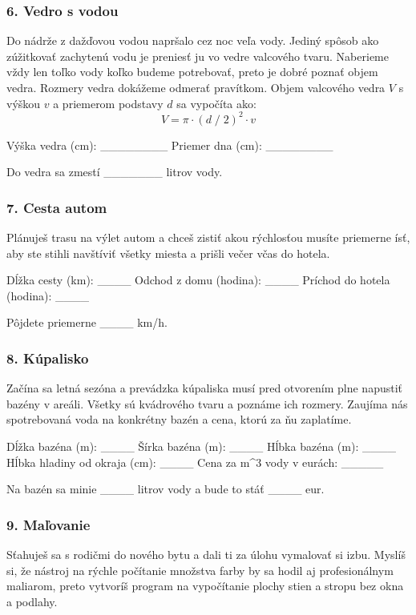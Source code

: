 \subsubsection*{6. Vedro s vodou}
Do nádrže z dažďovou vodou napršalo cez noc veľa vody. Jediný spôsob ako zúžitkovať zachytenú vodu je preniesť ju vo vedre valcového tvaru. Naberieme vždy len toľko vody koľko budeme potrebovať, preto je dobré poznať objem vedra. Rozmery vedra dokážeme odmerať pravítkom. Objem valcového vedra $V$ s výškou $v$ a priemerom podstavy $d$ sa vypočíta ako:
$$ V = \pi \cdot (d\;/\;2)^2 \cdot v $$

\begin{code}
Výška vedra (cm): ________
Priemer dna (cm): ________

Do vedra sa zmestí _______ litrov vody.
\end{code}

\subsubsection*{7. Cesta autom}
Plánuješ trasu na výlet autom a chceš zistiť akou rýchlosťou musíte priemerne ísť, aby ste stihli navštíviť všetky miesta a prišli večer včas do hotela.

\begin{code}
Dĺžka cesty (km): ____
Odchod z domu (hodina): ____
Príchod do hotela (hodina): ____

Pôjdete priemerne ____ km/h.
\end{code}

\subsubsection*{8. Kúpalisko}
Začína sa letná sezóna a prevádzka kúpaliska musí pred otvorením plne napustiť bazény v areáli. Všetky sú kvádrového tvaru a poznáme ich rozmery. Zaujíma nás spotrebovaná voda na konkrétny bazén a cena, ktorú za ňu zaplatíme.

\begin{code}
Dĺžka bazéna (m): ____
Šírka bazéna (m): ____
Hĺbka bazéna (m): ____
Hĺbka hladiny od okraja (cm): ____
Cena za m^3 vody v eurách: _____

Na bazén sa minie ____ litrov vody a bude to stáť ____ eur.
\end{code}

\subsubsection*{9. Maľovanie}
Sťahuješ sa s rodičmi do nového bytu a dali ti za úlohu vymalovať si izbu. Myslíš si, že nástroj na rýchle počítanie množstva farby by sa hodil aj profesionálnym maliarom, preto vytvoríš program na vypočítanie plochy stien a stropu bez okna a podlahy.

